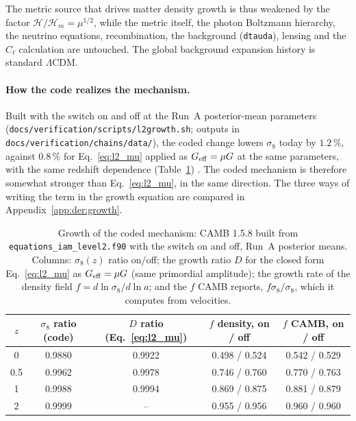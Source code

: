 The metric source that drives matter density growth is thus weakened by the factor $\mathcal H/\mathcal H_m=\mu^{1/2}$, while the metric itself, the
photon Boltzmann hierarchy, the neutrino equations, recombination, the background (\texttt{dtauda}), lensing and the $C_\ell$ calculation are
untouched. The global background expansion history is standard $\Lambda$CDM.

\paragraph{How the code realizes the mechanism.} Built with the switch on and off at the Run~A posterior-mean parameters
(\texttt{docs/\allowbreak{}verification/\allowbreak{}scripts/\allowbreak{}l2growth.sh}; outputs in
\texttt{docs/\allowbreak{}verification/\allowbreak{}chains/\allowbreak{}data/}), the coded change lowers $\sigma_8$ today by $1.2\,\%$, against $0.8\,\%$ for
Eq.~\eqref{eq:l2_mu} applied as $G_{\rm eff}=\mu G$ at the same parameters, with the same redshift dependence (Table~\ref{tab:l2_growth}) \measured.
The coded mechanism is therefore somewhat stronger than Eq.~\eqref{eq:l2_mu}, in the same direction. The three ways of writing the term in the
growth equation are compared in Appendix~\ref{app:der:growth}.

\begin{table}[htbp]\centering\small
\caption{Growth of the coded mechanism: CAMB 1.5.8 built from \texttt{equations\_iam\_level2.f90} with the switch on and off, Run~A posterior means.
Columns: $\sigma_8(z)$ ratio on/off; the growth ratio $D$ for the closed form Eq.~\eqref{eq:l2_mu} as $G_{\rm eff}=\mu G$ (same primordial amplitude);
the growth rate of the density field $f=d\ln\sigma_8/d\ln a$; and the $f$ CAMB reports, $f\sigma_8/\sigma_8$, which it computes from velocities.
\measured}\label{tab:l2_growth}
\begin{tabular}{ccccc}\hline
$z$ & $\sigma_8$ ratio (code) & $D$ ratio (Eq.~\ref{eq:l2_mu}) & $f$ density, on / off & $f$ CAMB, on / off\\\hline
0 & 0.9880 & 0.9922 & 0.498 / 0.524 & 0.542 / 0.529\\
0.5 & 0.9962 & 0.9978 & 0.746 / 0.760 & 0.770 / 0.763\\
1 & 0.9988 & 0.9994 & 0.869 / 0.875 & 0.881 / 0.879\\
2 & 0.9999 & -- & 0.955 / 0.956 & 0.960 / 0.960\\\hline
\end{tabular}\end{table}

